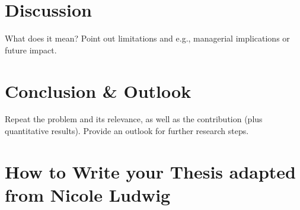 \documentclass{thesisclass}
\begin{document}
\chapter{Discussion} What does it mean? Point out limitations and e.g., managerial implications or future impact.
\chapter{Conclusion \& Outlook} Repeat the problem and its relevance, as well as the contribution (plus quantitative results). Provide an outlook for further research steps.



\chapter{How to Write your Thesis adapted from Nicole Ludwig}
\end{document}
